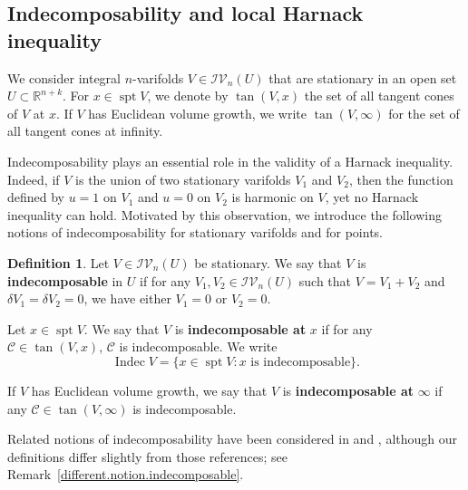 \documentclass[11pt]{amsart}
\newtheorem{theorem}{Theorem}[section]
\theoremstyle{definition}
\newtheorem{definition}[theorem]{Definition}
\newcommand{\R}{\mathbb{R}}
\newcommand{\C}{\mathcal{C}}
\newcommand{\IV}{\mathcal{IV}}
\DeclareMathOperator{\spt}{spt}
\DeclareMathOperator{\reg}{reg}
\DeclareMathOperator{\indec}{Indec}
\begin{document}
\subsection{Indecomposability and local Harnack inequality}
We consider integral $n$-varifolds $V \in \IV_n(U)$ that are stationary in an open set $U \subset \mathbb{R}^{n+k}$. 
For $x \in \spt V$, we denote by $\tan(V,x)$ the set of all tangent cones of $V$ at $x$. 
If $V$ has Euclidean volume growth, we write $\tan(V,\infty)$ for the set of all tangent cones at infinity.

Indecomposability plays an essential role in the validity of a Harnack inequality. Indeed, if $V$ is the union of two stationary varifolds $V_1$ and $V_2$, then the function defined by $u=1$ on $V_1$ and $u=0$ on $V_2$ is harmonic on $V$, yet no Harnack inequality can hold. 
Motivated by this observation, we introduce the following notions of indecomposability for stationary varifolds and for points.


\begin{definition}\label{definition.indecomposable}
    Let $V\in \IV_n(U)$ be stationary. We say that $V$ is \textbf{indecomposable} in $U$ if for any $V_1,V_2\in \IV_n(U)$ such that $V=V_1+V_2$ and $\delta V_1=\delta V_2=0$, we have either $V_1=0$ or $V_2=0$. 
    
    Let $x\in \spt V$. We say that $V$ is \textbf{indecomposable  at }$x$ if for any $\C\in \tan(V,x)$, $\C$ is indecomposable. We write \[\indec V=\{x\in \spt V: x\text{ is indecomposable}\}.\]

    If $V$ has Euclidean volume growth, we say that $V$ is \textbf{indecomposable  at }$\infty$ if any $\C\in \tan(V,\infty)$ is indecomposable.
\end{definition}
Related notions of indecomposability have been considered in \cite[Definition~2.15]{Modino} and \cite[Definition~6.2]{Me2weaklydifferentiable}, although our definitions differ slightly from those references; see Remark~\ref{different.notion.indecomposable}.
\end{document}
